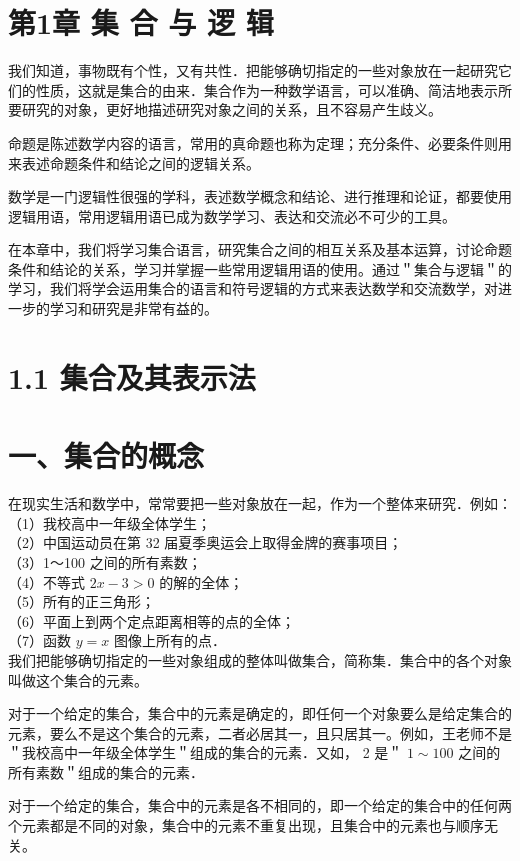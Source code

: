 \documentclass[10pt]{article}
\begin{document}
\section*{第1章 集 合 与 逻 辑}
我们知道，事物既有个性，又有共性．把能够确切指定的一些对象放在一起研究它们的性质，这就是集合的由来．集合作为一种数学语言，可以准确、简洁地表示所要研究的对象，更好地描述研究对象之间的关系，且不容易产生歧义。

命题是陈述数学内容的语言，常用的真命题也称为定理；充分条件、必要条件则用来表述命题条件和结论之间的逻辑关系。

数学是一门逻辑性很强的学科，表述数学概念和结论、进行推理和论证，都要使用逻辑用语，常用逻辑用语已成为数学学习、表达和交流必不可少的工具。

在本章中，我们将学习集合语言，研究集合之间的相互关系及基本运算，讨论命题条件和结论的关系，学习并掌握一些常用逻辑用语的使用。通过＂集合与逻辑＂的学习，我们将学会运用集合的语言和符号逻辑的方式来表达数学和交流数学，对进一步的学习和研究是非常有益的。

\section*{1.1 集合及其表示法}
\section*{一、集合的概念}
在现实生活和数学中，常常要把一些对象放在一起，作为一个整体来研究．例如：\\
（1）我校高中一年级全体学生；\\
（2）中国运动员在第 32 届夏季奥运会上取得金牌的赛事项目；\\
（3）1～100 之间的所有素数；\\
（4）不等式 \(2 x-3>0\) 的解的全体；\\
（5）所有的正三角形；\\
（6）平面上到两个定点距离相等的点的全体；\\
（7）函数 \(y=x\) 图像上所有的点．\\
我们把能够确切指定的一些对象组成的整体叫做集合，简称集．集合中的各个对象叫做这个集合的元素。

对于一个给定的集合，集合中的元素是确定的，即任何一个对象要么是给定集合的元素，要么不是这个集合的元素，二者必居其一，且只居其一。例如，王老师不是＂我校高中一年级全体学生＂组成的集合的元素．又如， 2 是＂ \(1 \sim 100\) 之间的所有素数＂组成的集合的元素．

对于一个给定的集合，集合中的元素是各不相同的，即一个给定的集合中的任何两个元素都是不同的对象，集合中的元素不重复出现，且集合中的元素也与顺序无关。
\end{document}
